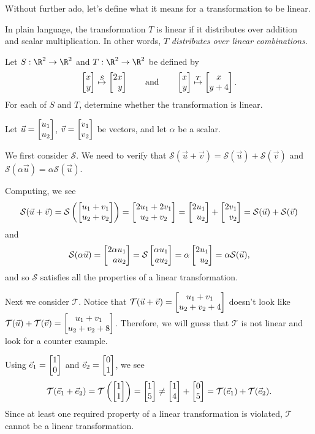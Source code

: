 Without further ado, let's define what it means for a transformation to be linear.


In plain language, the transformation $T$ is linear if it distributes over addition and scalar multiplication.
In other words, $T$ \emph{distributes over linear combinations}.

\begin{example}
	Let $S:\R^2\to\R^2$ and $T:\R^2\to\R^2$ be defined by
	\[
		\mat{x\\y}\stackrel{S}{\mapsto}\mat{2x\\y}\qquad\text{and}\qquad
		\mat{x\\y}\stackrel{T}{\mapsto}\matc{x\\y+4}.
	\]
	For each of $S$ and $T$, determine whether the transformation is linear.
	
	Let $\vec u=\mat{u_1\\u_2}$, $\vec v=\mat{v_1\\v_2}$ be vectors, and let $\alpha$ be a scalar.

	We first consider $\mathcal S$.
	We need to verify that $\mathcal S(\vec u+\vec v)=\mathcal S(\vec u)+\mathcal S(\vec v)$ 
	and $\mathcal S(\alpha\vec u)=\alpha\mathcal S(\vec u)$. 
	
	Computing, we see
	\[
	    \mathcal S(\vec u +\vec v)=\mathcal S\left(\mat{u_1+v_1\\u_2+v_2}\right)=\matc{2u_1+2v_1\\u_2+v_2}=\mat{2u_1\\u_2}+\mat{2v_1\\v_2}=\mathcal S(\vec u) + \mathcal S(\vec v)
	\]
	and
	\[
		\mathcal S(\alpha\vec u)=\mat{2\alpha u_1\\a u_2}=\mathcal S\mat{\alpha u_1\\a u_2}=\alpha\mat{2 u_1\\ u_2}=\alpha\mathcal S(\vec u),
	\]
	and so $\mathcal S$ satisfies all the properties of a linear transformation.
	
	\medskip
	Next we consider $\mathcal T$.
	Notice that $\mathcal T(\vec u+\vec v)=\begin{bmatrix}u_1+v_1\\u_2+v_2+4\end{bmatrix}$ doesn't 
	look like $\mathcal T(\vec u)+\mathcal T(\vec v)=\begin{bmatrix}u_1+v_1\\u_2+v_2+8\end{bmatrix}$. 
	Therefore, we will guess that $\mathcal T$ is not linear and look for a counter example. 
	
	Using $\xhat=\mat{1\\0}$ and $\yhat=\mat{0\\1}$, we see
	\[
	    \mathcal T(\xhat +\yhat)=\mathcal T\left(\mat{1\\1}\right)=\mat{1\\5} \neq \mat{1\\4}+\mat{0\\5}=\mathcal T(\xhat) + \mathcal T(\yhat).
	\]
	Since at least one required property of a linear transformation is violated, $\mathcal T$ cannot be a linear transformation.
\end{example}

